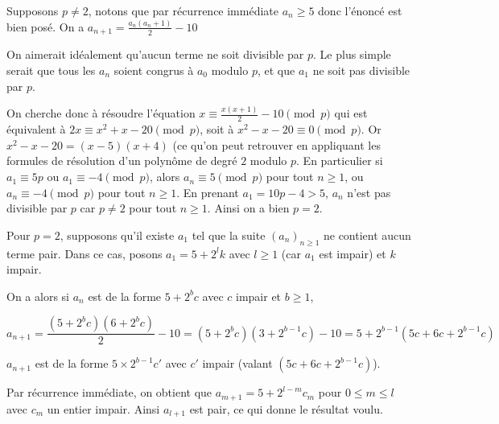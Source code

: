 \begin{sol}
Supposons $p\neq 2$, notons que par récurrence immédiate $a_n\geq 5$ donc l'énoncé est bien posé.
On a $a_{n + 1}=\frac{a_n(a_n + 1)}{2} - 10$

On aimerait idéalement qu'aucun terme ne soit divisible par $p$. Le plus simple serait que tous les $a_n$ soient congrus à $a_0$ modulo $p$, et que $a_1$ ne soit pas divisible par $p$.

On cherche donc à résoudre l'équation $x\equiv \frac{x(x + 1)}{2} - 10\pmod{p}$ qui est équivalent à $2x\equiv x^2 + x - 20\pmod{p}$, soit à $x^2 - x - 20\equiv 0\pmod{p}$. Or $x^2 - x - 20=(x - 5)(x + 4)$ (ce qu'on peut retrouver en appliquant les formules de résolution d'un polynôme de degré $2$ modulo $p$. En particulier si $a_1\equiv 5{p}$ ou $a_1\equiv  - 4\pmod{p}$, alors $a_n\equiv 5\pmod{p}$ pour tout $n\geq 1$, ou $a_n\equiv -4\pmod{p}$ pour tout $n\geq 1$. En prenant $a_1=10p - 4>5$, $a_n$ n'est pas divisible par $p$ car $p\neq 2$ pour tout $n\geq 1$. Ainsi on a bien $p=2$.

Pour $p=2$, supposons qu'il existe $a_1$ tel que la suite $(a_n)_{n\geq 1}$ ne contient aucun terme pair. Dans ce cas, posons $a_1=5 + 2^{l}k$ avec $l\geq 1$ (car $a_1$ est impair) et $k$ impair.

On a alors si $a_n$ est de la forme $5 + 2^b c$ avec $c$ impair et $b\geq 1$,

$$a_{n + 1}=\frac{(5 + 2^bc)(6 + 2^bc)}{2} - 10=(5 + 2^b c)(3 + 2^{b - 1}c) - 10=5 + 2^{b - 1}(5c + 6c + 2^{b - 1}c)$$

$a_{n + 1}$ est de la forme $5\times 2^{b - 1}c'$ avec $c'$ impair (valant $(5c + 6c + 2^{b - 1}c)$).

Par récurrence immédiate, on obtient que $a_{m + 1}=5 + 2^{l - m}c_m$ pour $0\leq m \leq l$ avec $c_m$ un entier impair. Ainsi $a_{l + 1}$ est pair, ce qui donne le résultat voulu.


\end{sol}

